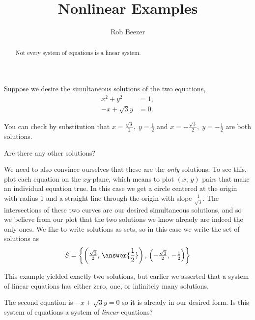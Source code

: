 \documentclass{ximera}
\author{Rob Beezer}
\title{Nonlinear Examples}
\begin{document}
\begin{abstract}
  Not every system of equations is a linear system.
\end{abstract}
\maketitle

\begin{example}
  Suppose we desire the simultaneous solutions of the two equations,
  \begin{align*}
    x^2+y^2&=1,\\
    -x+\sqrt{3}y&=0.
  \end{align*}
  
  You can check by substitution that $x=\tfrac{\sqrt{3}}{2},\;y=\tfrac{1}{2}$ and $x=-\tfrac{\sqrt{3}}{2},\;y=-\tfrac{1}{2}$ are both solutions.

  \begin{question}
    Are there any other solutions?
    \begin{multipleChoice}
    \end{multipleChoice}
    
    \begin{question}
      We need to also convince ourselves that these are the
      \textit{only} solutions.  To see this, plot each equation on the
      $xy$-plane, which means to plot $(x,\,y)$ pairs that make an
      individual equation true.  In this case we get a circle centered
      at the origin with radius 1 and a straight line through the origin
      with slope $\tfrac{1}{\sqrt{3}}$.  The intersections of these two
      curves are our desired simultaneous solutions, and so we believe
      from our plot that the two solutions we know already are indeed
      the only ones.  We like to write solutions as sets, so in this
      case we write the set of solutions as
      \[
        S=\set{\left(\tfrac{\sqrt{3}}{2},\,\answer{\frac{1}{2}}\right),\,\left(-\tfrac{\sqrt{3}}{2},\,-\tfrac{1}{2}\right)}
      \]
      
      \begin{question}
        This example yielded exactly two solutions, but earlier we asserted that a system of linear equations has either zero, one, or infinitely many solutions.
        
        The second equation is $-x+\sqrt{3}y=0$ so it is already in our desired form.  Is this system of equations a system of \textit{linear} equations?
        \begin{multipleChoice}
        \end{multipleChoice}
        

\end{question}
\end{question}
\end{question}
\end{example}
\end{document}
